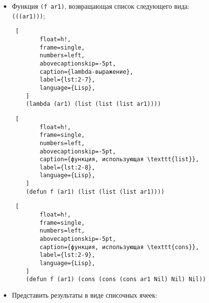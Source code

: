 \begin{itemize}
    \clearpage
    
    \begin{lstlisting} [
		float=h!,
		frame=single,
		numbers=left,
		abovecaptionskip=-5pt,
		caption={функция, использующая \texttt{cons}},
		label={lst:2-6},
		language={Lisp},
	]
    (defun f (ar1 ar2) 
        (cons
            (cons ar1 Nil)
            (cons (cons ar2 Nil) Nil)
        )
    )
    \end{lstlisting}
    
    \item Функция \texttt{(f ar1)}, возвращающая список следующего вида:\\\texttt{(((ar1)))};
    
    \begin{lstlisting} [
		float=h!,
		frame=single,
		numbers=left,
		abovecaptionskip=-5pt,
		caption={lambda-выражение},
		label={lst:2-7},
		language={Lisp},
	]
    (lambda (ar1) (list (list (list ar1))))
    \end{lstlisting}
    
    \begin{lstlisting} [
		float=h!,
		frame=single,
		numbers=left,
		abovecaptionskip=-5pt,
		caption={функция, использующая \texttt{list}},
		label={lst:2-8},
		language={Lisp},
	]
    (defun f (ar1) (list (list (list ar1))))
    \end{lstlisting}
    
    \begin{lstlisting} [
		float=h!,
		frame=single,
		numbers=left,
		abovecaptionskip=-5pt,
		caption={функция, использующая \texttt{cons}},
		label={lst:2-9},
		language={Lisp},
	]
    (defun f (ar1) (cons (cons (cons ar1 Nil) Nil) Nil))
    \end{lstlisting}
    
    \item Представить результаты в виде списочных ячеек:
    
    
    
    
    
    
    
    

    
\end{itemize}